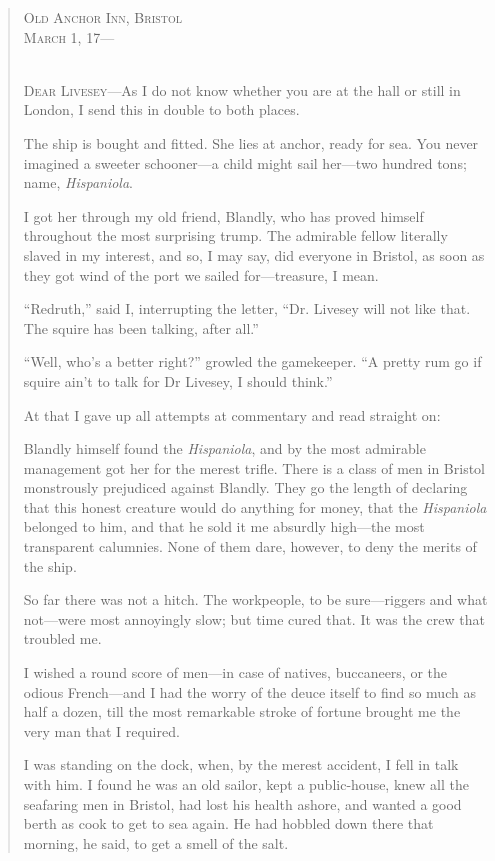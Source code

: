 \begin{quotation}
\hfill\begin{minipage}{0.6\linewidth}\textsc{Old Anchor Inn, Bristol\\March 1, 17---}\end{minipage}\\
\nopagebreak
\textsc{Dear Livesey}---As I do not know whether you are at the hall or still in London, I send this in double to both places.

The ship is bought and fitted. She lies at anchor, ready for sea. You never imagined a sweeter schooner---a child might sail her---two hundred tons; name, \textit{Hispaniola}.

I got her through my old friend, Blandly, who has proved himself throughout the most surprising trump. The admirable fellow literally slaved in my interest, and so, I may say, did everyone in Bristol, as soon as they got wind of the port we sailed for---treasure, I mean.

\enquote{Redruth,} said I, interrupting the letter, \enquote{Dr. Livesey will not like that. The squire has been talking, after all.}

\enquote{Well, who’s a better right?} growled the gamekeeper. \enquote{A pretty rum go if squire ain’t to talk for Dr Livesey, I should think.}

At that I gave up all attempts at commentary and read straight on:

Blandly himself found the \textit{Hispaniola}, and by the most admirable management got her for the merest trifle. There is a class of men in Bristol monstrously prejudiced against Blandly. They go the length of declaring that this honest creature would do anything for money, that the \textit{Hispaniola} belonged to him, and that he sold it me absurdly high---the most transparent calumnies. None of them dare, however, to deny the merits of the ship.

So far there was not a hitch. The workpeople, to be sure---riggers and what not---were most annoyingly slow; but time cured that. It was the crew that troubled me.

I wished a round score of men---in case of natives, buccaneers, or the odious French---and I had the worry of the deuce itself to find so much as half a dozen, till the most remarkable stroke of fortune brought me the very man that I required.

I was standing on the dock, when, by the merest accident, I fell in talk with him. I found he was an old sailor, kept a public-house, knew all the seafaring men in Bristol, had lost his health ashore, and wanted a good berth as cook to get to sea again. He had hobbled down there that morning, he said, to get a smell of the salt.


\end{quotation}
